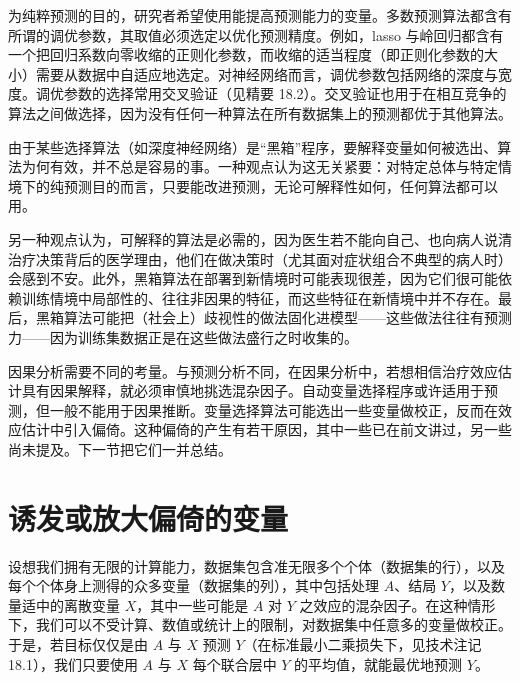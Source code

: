 为纯粹预测的目的，研究者希望使用能提高预测能力的变量。多数预测算法都含有所谓的调优参数，其取值必须选定以优化预测精度。例如，lasso 与岭回归都含有一个把回归系数向零收缩的正则化参数，而收缩的适当程度（即正则化参数的大小）需要从数据中自适应地选定。对神经网络而言，调优参数包括网络的深度与宽度。调优参数的选择常用交叉验证（见精要 18.2）。交叉验证也用于在相互竞争的算法之间做选择，因为没有任何一种算法在所有数据集上的预测都优于其他算法。

由于某些选择算法（如深度神经网络）是“黑箱”程序，要解释变量如何被选出、算法为何有效，并不总是容易的事。一种观点认为这无关紧要：对特定总体与特定情境下的纯预测目的而言，只要能改进预测，无论可解释性如何，任何算法都可以用。

另一种观点认为，可解释的算法是必需的，因为医生若不能向自己、也向病人说清治疗决策背后的医学理由，他们在做决策时（尤其面对症状组合不典型的病人时）会感到不安。此外，黑箱算法在部署到新情境时可能表现很差，因为它们很可能依赖训练情境中局部性的、往往非因果的特征，而这些特征在新情境中并不存在。最后，黑箱算法可能把（社会上）歧视性的做法固化进模型——这些做法往往有预测力——因为训练集数据正是在这些做法盛行之时收集的。

因果分析需要不同的考量。与预测分析不同，在因果分析中，若想相信治疗效应估计具有因果解释，就必须审慎地挑选混杂因子。自动变量选择程序或许适用于预测，但一般不能用于因果推断。变量选择算法可能选出一些变量做校正，反而在效应估计中引入偏倚。这种偏倚的产生有若干原因，其中一些已在前文讲过，另一些尚未提及。下一节把它们一并总结。

\section{诱发或放大偏倚的变量}

设想我们拥有无限的计算能力，数据集包含准无限多个个体（数据集的行），以及每个个体身上测得的众多变量（数据集的列），其中包括处理 $A$、结局 $Y$，以及数量适中的离散变量 $X$，其中一些可能是 $A$ 对 $Y$ 之效应的混杂因子。在这种情形下，我们可以不受计算、数值或统计上的限制，对数据集中任意多的变量做校正。于是，若目标仅仅是由 $A$ 与 $X$ 预测 $Y$（在标准最小二乘损失下，见技术注记 18.1），我们只要使用 $A$ 与 $X$ 每个联合层中 $Y$ 的平均值，就能最优地预测 $Y$。

\begin{figure}[htbp]
\centering
{}
\caption{}
\label{fig:18.1}
\end{figure}

